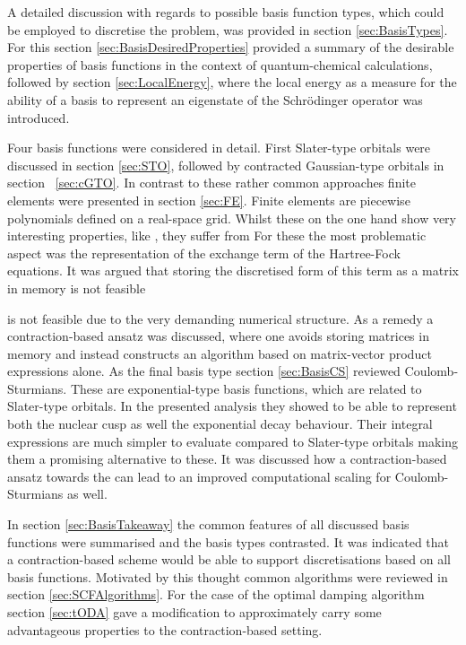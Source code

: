 
A detailed discussion with regards to possible basis function types,
which could be employed to discretise the \HF problem,
was provided in section \ref{sec:BasisTypes}.
For this section \ref{sec:BasisDesiredProperties}
provided a summary of the desirable properties of basis functions
in the context of quantum-chemical calculations,
followed by section \ref{sec:LocalEnergy},
where the local energy as a measure
for the ability of a basis to represent an eigenstate
of the Schrödinger operator was introduced.

Four basis functions were considered in detail.
First Slater-type orbitals were discussed in section \ref{sec:STO},
followed by contracted Gaussian-type orbitals
in section ~\ref{sec:cGTO}.
In contrast to these rather common approaches 
finite elements were presented in section \ref{sec:FE}.
Finite elements are piecewise polynomials defined on a real-space grid.
Whilst these on the one hand show very interesting properties,
like %
, they suffer from %
For these the most problematic aspect
was the representation of the exchange term of the Hartree-Fock equations.
It was argued that storing the discretised form of this term as a matrix in memory
is not feasible

is not feasible due to the very demanding numerical structure.
As a remedy a contraction-based ansatz was discussed,
where one avoids storing matrices in memory
and instead constructs an algorithm based
on matrix-vector product expressions alone.
As the final basis type section \ref{sec:BasisCS} reviewed Coulomb-Sturmians.
These are exponential-type basis functions,
which are related to Slater-type orbitals.
In the presented analysis they showed to be able to represent both
the nuclear cusp as well the exponential decay behaviour.
Their integral expressions are much simpler to evaluate
compared to Slater-type orbitals making them a promising alternative to these.
It was discussed how a contraction-based ansatz
towards the \SCF can lead to an improved computational scaling for
Coulomb-Sturmians as well.

In section \ref{sec:BasisTakeaway}
the common features of all discussed basis functions
were summarised and the basis types contrasted.
It was indicated that a contraction-based \SCF scheme
would be able to support discretisations based on all basis functions.
Motivated by this thought
common \SCF algorithms were reviewed in section \ref{sec:SCFAlgorithms}.
For the case of the optimal damping algorithm~\cite{Cances2000a}
section \ref{sec:tODA} gave a modification
to approximately carry some advantageous
properties to the contraction-based setting.

